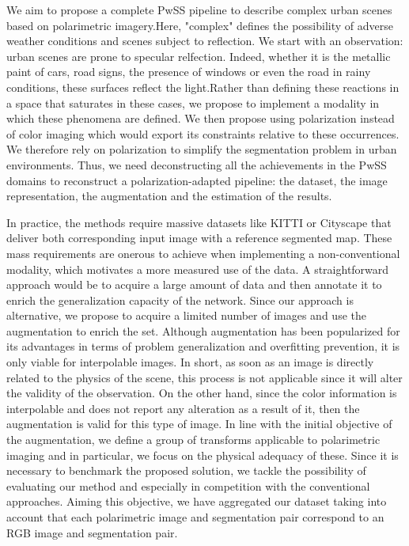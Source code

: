 We aim to propose a complete PwSS pipeline to describe complex urban scenes based on polarimetric imagery.Here, "complex" defines the possibility of adverse weather conditions and scenes subject to reflection. We start with an observation: urban scenes are prone to specular relfection. Indeed, whether it is the metallic paint of cars, road signs, the presence of windows or even the road in rainy conditions, these surfaces reflect the light.Rather than defining these reactions in a space that saturates in these cases, we propose to implement a modality in which these phenomena are defined.
We then propose using polarization instead of color imaging which would export its constraints relative to these occurrences. We therefore rely on polarization to simplify the segmentation problem in urban environments.
Thus, we need deconstructing all the achievements in the PwSS domains to reconstruct a polarization-adapted pipeline: the dataset, the image representation, the augmentation and the estimation of the results.

In practice, the methods require massive datasets like KITTI \cite{Geiger2012CVPR} or Cityscape \cite{Cordts2016Cityscapes} that deliver both corresponding input image with a reference segmented map.
These mass requirements are onerous to achieve when implementing a non-conventional modality, which motivates a more measured use of the data.
A straightforward approach would be to acquire a large amount of data and then annotate it to enrich the generalization capacity of the network. Since our approach is alternative, we propose to acquire a limited number of images and use the augmentation to enrich the set.
Although augmentation has been popularized for its advantages in terms of problem generalization and overfitting prevention, it is only viable for interpolable images. In short, as soon as an image is directly related to the physics of the scene, this process is not applicable since it will alter the validity of the observation. On the other hand, since the color information is interpolable and does not report any alteration as a result of it, then the augmentation is valid for this type of image.
In line with the initial objective of the augmentation, we define a group of transforms applicable to polarimetric imaging and in particular, we focus on the physical adequacy of these.
Since it is necessary to benchmark the proposed solution, we tackle the possibility of evaluating our method and especially in competition with the conventional approaches. Aiming this objective, we have aggregated our dataset taking into account that each polarimetric image and segmentation pair correspond to an RGB image and segmentation pair. 
 
